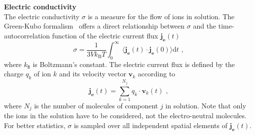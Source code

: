 \newline \newline
\textbf{Electric conductivity}\\
The electric conductivity $\sigma$ is a measure for the flow of ions in solution. The Green-Kubo formalism~\parencite{Gubbins1972} offers a direct relationship between $\sigma$ and the time-autocorrelation function of the electric current flux $\bm{j_e}(t)$ ~\parencite{HansenBook}
\begin{equation}
\sigma=\frac{1}{3Vk_{\mathrm{B}}T}\int_0^{\infty}~\big\langle \bm{j_e}(t)\cdot \bm{j_e}(0) \big\rangle  \mathrm{d} t \mbox{   ,}
\label{Erdalkali_elcond}
\end{equation}
where $k_\texttt{B}$ is Boltzmann's constant. The electric current flux is defined by the charge $q_k$ of ion $k$ and its velocity vector $\bm{v}_k$ according to
\begin{equation}
\bm{j_e}(t)=\sum_{k=1}^{N_{j}} q_k \cdot \bm{v}_{k}(t) \mbox{   ,}
\label{elflux}
\end{equation}
where $N_{j}$ is the number of molecules of component $j$ in solution. Note that only the ions in the solution have to be considered, not the electro-neutral molecules. For better statistics, $\sigma$ is sampled over all independent spatial elements of $\bm{j_e}(t)$.


